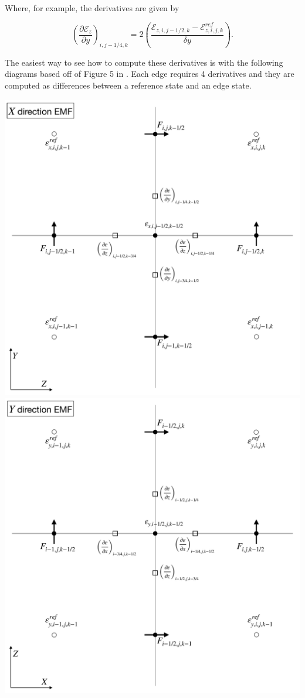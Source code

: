 Where, for example, the derivatives are given by

$$
    \left( \frac{\partial \mathcal{E}_z }{\partial y} \right)_{i, j-1/4, k} =
    2 \left( \frac{\mathcal{E}_{z,i,j-1/2,k} - \mathcal{E}_{z,i,j,k}^{ref}}{\delta y} \right).
$$

The easiest way to see how to compute these derivatives is with the following diagrams based off of Figure 5 in \citeyear[Stone et al.][]{stone_athena_2008}. Each edge requires 4 derivatives and they are computed as differences between a reference state and an edge state.

\includegraphics[scale=0.15]{assets/2-methods/CT-edge-field-figures-X.pdf}
\includegraphics[scale=0.15]{assets/2-methods/CT-edge-field-figures-Y.pdf}
